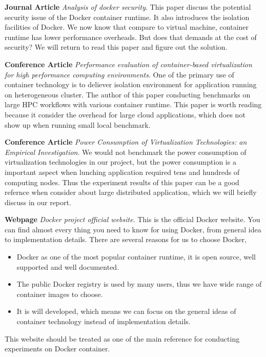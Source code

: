 \documentclass{article}
\begin{document}
\medskip

\textbf{Journal Article} \emph{Analysis of docker security}\cite{bui2015analysis}. This paper 
discuss the potential security issue of the Docker container runtime. It also introduces the 
isolation facilities of Docker. We now know that compare to virtual machine, container runtime 
has lower performance overheads. But does that demands at the cost of security? We will return to
read this paper and figure out the solution. 

\medskip

\textbf{Conference Article} \emph{Performance evaluation of container-based virtualization for 
high performance computing environments}\cite{xavier2013performance}. One of the primary use of
container technology is to deliever isolation environment for application running on heterogeneous 
cluster. The author of this paper conducting benchmarks on large HPC workflows with various 
container runtime. This paper is worth reading because it consider the overhead for large 
cloud applications, which does not show up when running small local benchmark.

\medskip

\textbf{Conference Article} \emph{Power Consumption of Virtualization Technologies: an 
Empirical Investigation}\cite{morabito2015power}. We would not benchmark the power consumption 
of virtualization technologies in our project, but the power consumption is a important 
aspect when lunching application required tens and hundreds of computing nodes. Thus the 
experiment results of this paper can be a good refernce when consider about large distributed
application, which we will briefly discuss in our report.

\medskip

\textbf{Webpage} \emph{Docker project official website}\cite{dockerwb}. This is the official 
Docker website. You can find almost every thing you need to know for using Docker, from 
general idea to implementation details.  There are several reasons for us to choose Docker,
\begin{itemize}
    \item Docker as one of the most popular container runtime, it is open source, well supported 
        and well documented.
    \item The public Docker registry is used by many users, thus we have wide range of 
        container images to choose.
    \item It is will developed, which means we can focus on the general ideas of container technology
        instead of implementation details.
\end{itemize}
This website should be treated as one of the main reference for conducting experiments on Docker 
container.
\end{document}
